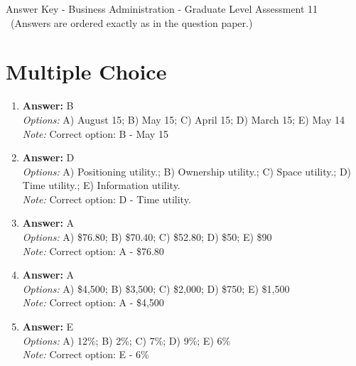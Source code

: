 \documentclass[12pt]{article}
\begin{document}
\begin{center}
Answer Key - Business Administration - Graduate Level Assessment 11 \
\small (Answers are ordered exactly as in the question paper.)
\end{center}

\section*{Multiple Choice}
\begin{enumerate}[label=\arabic*.]
\item \textbf{Answer:} B
\\ \textit{Options:} A) August 15; B) May 15; C) April 15; D) March 15; E) May 14
\\ \textit{Note:} Correct option: B - May 15
\item \textbf{Answer:} D
\\ \textit{Options:} A) Positioning utility.; B) Ownership utility.; C) Space utility.; D) Time utility.; E) Information utility.
\\ \textit{Note:} Correct option: D - Time utility.
\item \textbf{Answer:} A
\\ \textit{Options:} A) \$76.80; B) \$70.40; C) \$52.80; D) \$50; E) \$90
\\ \textit{Note:} Correct option: A - \$76.80
\item \textbf{Answer:} A
\\ \textit{Options:} A) \$4,500; B) \$3,500; C) \$2,000; D) \$750; E) \$1,500
\\ \textit{Note:} Correct option: A - \$4,500
\item \textbf{Answer:} E
\\ \textit{Options:} A) 12\%; B) 2\%; C) 7\%; D) 9\%; E) 6\%
\\ \textit{Note:} Correct option: E - 6\%
\end{enumerate}
\end{document}
